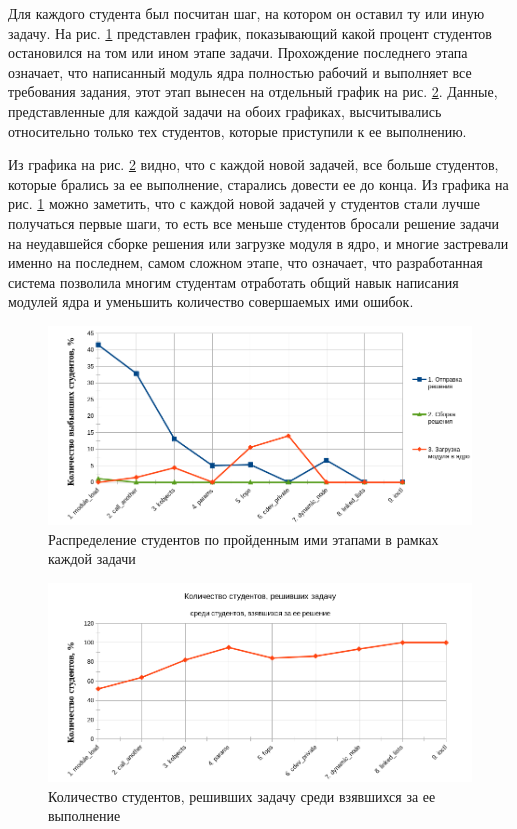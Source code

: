 Для каждого студента был посчитан шаг, на котором он оставил ту или иную задачу. На рис. \ref{fig:mesh3} представлен график, показывающий какой процент студентов остановился на том или ином этапе задачи. Прохождение последнего этапа означает, что написанный модуль ядра полностью рабочий и выполняет все требования задания, этот этап вынесен на отдельный график на рис. \ref{fig:mesh4}. Данные, представленные для каждой задачи на обоих графиках, высчитывались относительно только тех студентов, которые приступили к ее выполнению.

Из графика на рис. \ref{fig:mesh4} видно, что с каждой новой задачей, все больше студентов, которые брались за ее выполнение, старались довести ее до конца. Из графика на рис. \ref{fig:mesh3} можно заметить, что с каждой новой задачей у студентов стали лучше получаться первые шаги, то есть все меньше студентов бросали решение задачи на неудавшейся сборке решения или загрузке модуля в ядро, и многие застревали именно на последнем, самом сложном  этапе, что означает, что разработанная система позволила многим студентам отработать общий навык написания модулей ядра и уменьшить количество совершаемых ими ошибок.

\begin{figure}[!t]
\centering
\includegraphics[width=6in]{steps}
\caption{Распределение студентов по пройденным ими этапами в рамках каждой задачи}
\label{fig:mesh3}
\end{figure}

\begin{figure}[!t]
	\centering
	\includegraphics[width=6in]{last_steps}
	\caption{Количество студентов, решивших задачу среди взявшихся за ее выполнение}
	\label{fig:mesh4}
\end{figure}

